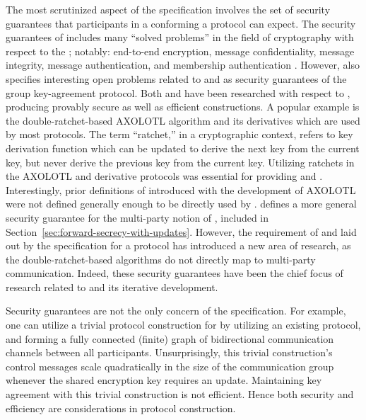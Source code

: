 The most scrutinized aspect of the  specification involves the set of security guarantees that participants in a conforming a protocol can expect.
The security guarantees of  includes many ``solved problems'' in the field of cryptography with respect to the ; notably: end-to-end encryption, message confidentiality, message integrity, message authentication, and membership authentication \autocite{rfc4949}.
However,  also specifies interesting open problems related to  \autocite{gunther1989identity} and  \autocite{cohn2016post} as security guarantees of the group key-agreement protocol.
Both  and  have been researched with respect to , producing provably secure as well as efficient constructions.
A popular example is the double-ratchet-based AXOLOTL algorithm \autocite{perrin2014axolotl} and its derivatives which are used by most  protocols.
The term ``ratchet,'' in a cryptographic context, refers to key derivation function which can be updated to derive the next key from the current key, but never derive the previous key from the current key.
Utilizing ratchets in the AXOLOTL and derivative protocols was essential for providing  and .
Interestingly, prior definitions of  introduced with the development of AXOLOTL were not defined generally enough to be directly used by .
 defines a more general security guarantee for the multi-party notion of , included in Section\ \ref{sec:forward-secrecy-with-updates}.
However, the requirement of  and  laid out by the  specification for a  protocol has introduced a new area of research, as the double-ratchet-based algorithms do not directly map to multi-party communication.
Indeed, these  security guarantees have been the chief focus of research related to  and its iterative development.

Security guarantees are not the only concern of the  specification.
For example, one can utilize a trivial protocol construction for  by utilizing an existing  protocol, and forming a fully connected (finite) graph of bidirectional  communication channels between all  participants.
Unsurprisingly, this trivial construction's control messages scale quadratically in the size of the communication group whenever the shared encryption key requires an update.
Maintaining key agreement with this trivial construction is not efficient.
Hence both security and efficiency are considerations in protocol construction.

